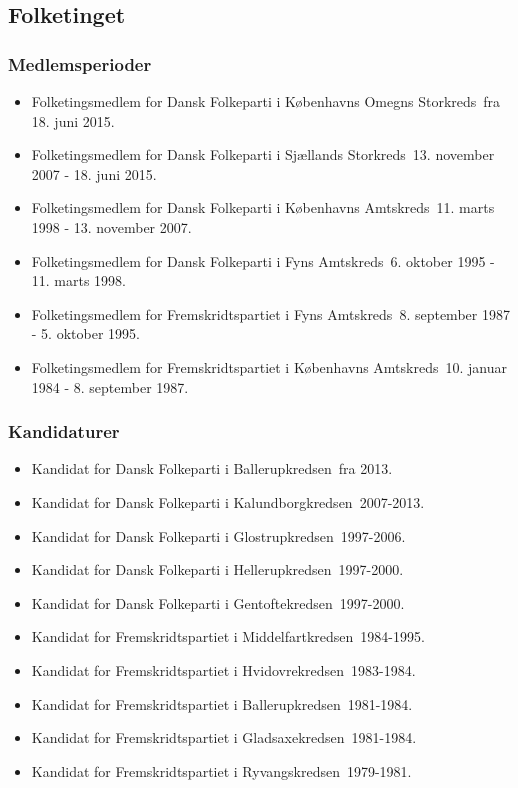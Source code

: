 \documentclass[11pt, a4paper]{awesome-cv}
\begin{document}
\begin{cvletter}
\subsection*{Folketinget}
\subsubsection*{Medlemsperioder}
\begin{itemize}
\item Folketingsmedlem for Dansk Folkeparti i Københavns Omegns Storkreds fra 18. juni 2015.
\item Folketingsmedlem for Dansk Folkeparti i Sjællands Storkreds 13. november 2007 - 18. juni 2015.
\item Folketingsmedlem for Dansk Folkeparti i Københavns Amtskreds 11. marts 1998 - 13. november 2007.
\item Folketingsmedlem for Dansk Folkeparti i Fyns Amtskreds 6. oktober 1995 - 11. marts 1998.
\item Folketingsmedlem for Fremskridtspartiet i Fyns Amtskreds 8. september 1987 - 5. oktober 1995.
\item Folketingsmedlem for Fremskridtspartiet i Københavns Amtskreds 10. januar 1984 - 8. september 1987.
\end{itemize}
\subsubsection*{Kandidaturer}
\begin{itemize}
\item Kandidat for Dansk Folkeparti i Ballerupkredsen fra 2013.
\item Kandidat for Dansk Folkeparti i Kalundborgkredsen 2007-2013.
\item Kandidat for Dansk Folkeparti i Glostrupkredsen 1997-2006.
\item Kandidat for Dansk Folkeparti i Hellerupkredsen 1997-2000.
\item Kandidat for Dansk Folkeparti i Gentoftekredsen 1997-2000.
\item Kandidat for Fremskridtspartiet i Middelfartkredsen 1984-1995.
\item Kandidat for Fremskridtspartiet i Hvidovrekredsen 1983-1984.
\item Kandidat for Fremskridtspartiet i Ballerupkredsen 1981-1984.
\item Kandidat for Fremskridtspartiet i Gladsaxekredsen 1981-1984.
\item Kandidat for Fremskridtspartiet i Ryvangskredsen 1979-1981.
\end{itemize}

\end{cvletter}
\end{document}
